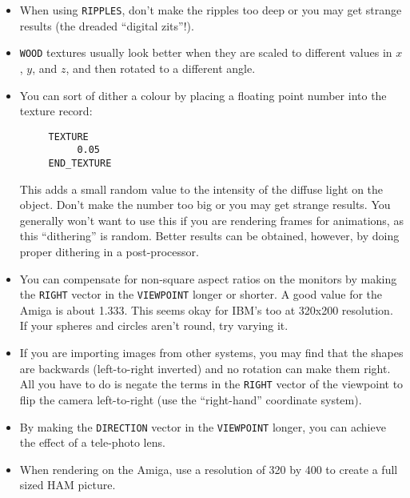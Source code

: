 \begin{itemize}
\item When using {\tt RIPPLES}, don't make the
ripples too deep or you may get
strange results (the dreaded ``digital zits''!).

\item {\tt WOOD} textures
usually look better when they are scaled to different
values in $x$, $y$, and $z$, and then rotated to a different angle.

\item You can sort of dither a colour
by placing a floating point number into the texture record:
\begin{verbatim}
     TEXTURE
          0.05
     END_TEXTURE
\end{verbatim}
This adds a small random value to the intensity of the diffuse
light on the object.  Don't make the number too big or you may get
strange results.  You generally won't want to use this if you are
rendering frames for animations, as
this ``dithering'' is random.
Better results can be obtained, however, by doing proper dithering
in a post-processor.

\item You can compensate for non-square aspect ratios
on the monitors by making the {\tt RIGHT} vector in
the {\tt VIEWPOINT}
longer or shorter.  A good value for the Amiga is about 1.333.
This seems okay for IBM's too at 320x200 resolution.  If your spheres
and circles aren't round, try varying it.

\item If you are importing images from other systems, you may find that
the shapes are backwards (left-to-right inverted) and no rotation
can make them right.  All you have to do is negate the terms in the
{\tt RIGHT} vector of the viewpoint to flip the camera left-to-right (use
the ``right-hand'' coordinate system).

\item By making the {\tt DIRECTION} vector in
the {\tt VIEWPOINT} longer, you can achieve the
effect of a tele-photo lens.

\item When rendering on the Amiga, use a resolution of 320 by 400 to
create a full sized HAM picture.
\end{itemize}
